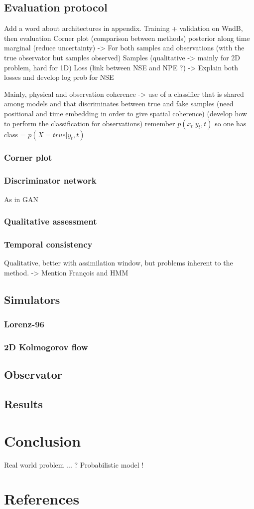 \documentclass[a4paper, 12pt]{article}
\begin{document}
\subsection{Evaluation protocol}
Add a word about architectures in appendix.
Training + validation on WndB, then evaluation 
Corner plot (comparison between methods) posterior along time marginal (reduce uncertainty)
-> For both samples and observations (with the true observator but samples observed)
Samples (qualitative -> mainly for 2D problem, hard for 1D)
Loss (link between NSE and NPE ?) -> Explain both losses and develop log prob for NSE 

Mainly, physical and observation coherence 
-> use of a classifier that is shared among models and that discriminates between true and fake samples 
(need positional and time embedding in order to give spatial coherence)
(develop how to perform the classification for observations)
remember $p(x_t|y_t,t)$ so one has class = $p(X = true|y_t, t)$
\subsubsection{Corner plot}
\subsubsection{Discriminator network}
As in GAN 
\subsubsection{Qualitative assessment}
\subsubsection{Temporal consistency}
Qualitative, better with assimilation window, but problems inherent to the method.
-> Mention François and HMM


\subsection{Simulators}
\subsubsection{Lorenz-96}
\subsubsection{2D Kolmogorov flow}
\subsection{Observator}
\subsection{Results}

\section{Conclusion}
Real world problem ... ? 
Probabilistic model !
\section{References}
\end{document}
